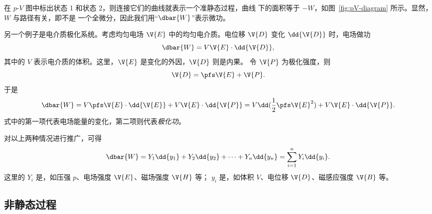 %     
%     
%     
%     
%     

在 $p$-$\!V$ 图中标出状态 1 和状态 2，则连接它们的曲线就表示一个准静态过程，曲线
下的面积等于 $-W$，如图~\ref{fig:pV-diagram} 所示。显然，$W$ 与路径有关，即不是
一个全微分，因此我们用“$\dbar{W}$”表示微功。

另一个例子是电介质极化系统。考虑均匀电场 $\V{E}$ 中的均匀电介质。电位移 $\V{D}$
变化 $\dd{\V{D}}$ 时，电场做功
\begin{equation}
  \dbar{W} = V \V{E} \cdot \dd{\V{D}},
\end{equation}
其中的 $V$ 表示电介质的体积。这里，$\V{E}$ 是变化的外因，$\V{D}$ 则是内果。
令 $\V{P}$ 为极化强度，则
\begin{equation}
  \V{D} = \pfs \V{E} + \V{P}.
\end{equation}
于是
\begin{equation}
  \dbar{W} = V \pfs \V{E} \cdot \dd{\V{E}} + V \V{E} \cdot \dd{\V{P}}
  = V \dd(\frac{1}{2} \pfs \V{E}^2) + V \V{E} \cdot \dd{\V{P}}.
\end{equation}
式中的第一项代表电场能量的变化，第二项则代表\emph{极化功}。

对以上两种情况进行推广，可得
\begin{equation} \label{eq:work-general}
  \dbar{W} = Y_1 \dd{y_1} + Y_2 \dd{y_2} + \cdots + Y_n \dd{y_n}
  = \sum_{i=1}^{n} Y_i \dd{y_i}.
\end{equation}
这里的 $Y_i$ 是，如压强 $p$、电场强度 $\V{E}$、磁场强度 $\V{H}$ 等；
$y_i$ 是，如体积 $V$、电位移 $\V{D}$、磁感应强度 $\V{B}$ 等。

\subsection{非静态过程}


